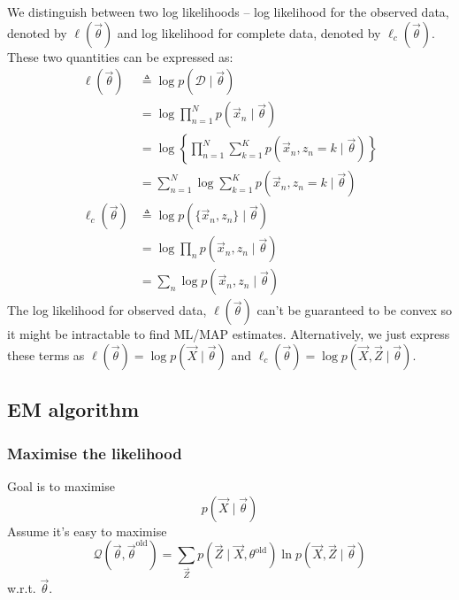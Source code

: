 We distinguish between two log likelihoods -- log likelihood for the observed data, denoted by $\ell(\vec \theta)$ and log likelihood for complete data, denoted by $\ell_c(\vec \theta)$. These two quantities can be expressed as:
\begin{align}
    \ell(\vec \theta)   &\triangleq \log p(\mathcal D \mid \vec \theta) \nonumber\\
                        &= \log \prod_{n = 1}^N p(\vec x_n \mid \vec \theta)\nonumber\\
                        &= \log \left\{\prod_{n = 1}^N \sum_{k = 1}^K p(\vec x_n, z_n = k \mid \vec \theta)\right\} \nonumber\\
                        &= \sum_{n = 1}^N \log \sum_{k = 1}^K p(\vec x_n, z_n = k \mid \vec \theta)\\
    \ell_c(\vec \theta) &\triangleq \log p\left(\{\vec x_n, z_n\} \mid \vec \theta\right) \nonumber\\
                        &= \log \prod_n p(\vec x_n, z_n \mid \vec \theta) \nonumber\\
                        &= \sum_n \log p(\vec x_n, z_n \mid \vec \theta)
\end{align}
The log likelihood for observed data, $\ell(\vec \theta)$ can't be guaranteed to be convex so it might be intractable to find ML/MAP estimates. Alternatively, we just express these terms as $\ell(\vec \theta) = \log p(\vec X \mid \vec \theta)$ and $\ell_c(\vec \theta) = \log p (\vec X, \vec Z \mid \vec \theta)$.

\subsection{EM algorithm}
\subsubsection{Maximise the likelihood}
Goal is to maximise 
$$p(\vec X \mid \vec \theta)$$
Assume it's easy to maximise
\begin{equation}
    \mathcal Q\left(\vec \theta, \vec \theta^{\text{old}}\right) = \sum_{\vec Z} p\left(\vec Z \mid \vec X, \theta^{\text{old}}\right) \ln p\left(\vec X, \vec Z \mid \vec \theta\right)
\end{equation}
w.r.t. $\vec \theta$.

